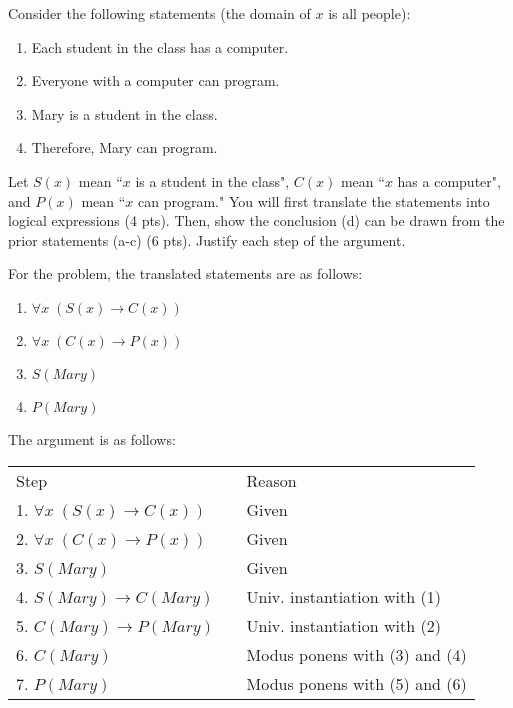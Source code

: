 \documentclass[12pt,addpoints]{exam}
\newcommand{\ra}{\rightarrow}
\begin{document}
\begin{questions}
\question[10] Consider the following statements (the domain of $x$ is all people):
	\begin{enumerate}[label=(\alph*),itemsep=0pt,parsep=0pt,
    	topsep=0pt,partopsep=0pt]
    	\item Each student in the class has a computer.
    	\item Everyone with a computer can program.
    	\item Mary is a student in the class.
    	\item Therefore, Mary can program.
    \end{enumerate}
Let $S(x)$ mean ``$x$ is a student in the class", $C(x)$ mean ``$x$ has a computer", and $P(x)$ mean ``$x$ can program."  You will first translate the statements into logical expressions (4 pts).  Then, show the conclusion (d) can be drawn from the prior statements (a-c) (6 pts).  Justify each step of the argument.
	\ifprintanswers
        \vspace{-10pt}
    \fi
\begin{solution}
    For the problem, the translated statements are as follows:
	\begin{enumerate}[label=(\alph*),itemsep=0pt,parsep=0pt,
    	topsep=0pt,partopsep=0pt]
    	\item $\forall x\; (S(x) \ra C(x))$
    	\item $\forall x\; (C(x) \ra P(x))$
    	\item $S(Mary)$
    	\item $P(Mary)$
    \end{enumerate}
    
    The argument is as follows:
    
    \begin{tabular}{lll}
            Step                    & \hspace{0.15in} & Reason \\
            1. $\forall x\; (S(x) \ra C(x))$			& & Given \\
            2. $\forall x\; (C(x) \ra P(x))$			& & Given \\
            3. $S(Mary)$								& & Given \\
            4. $S(Mary) \ra C(Mary)$   					& & Univ. instantiation with (1) \\
            5. $C(Mary) \ra P(Mary)$                    & & Univ. instantiation with (2) \\
            6. $C(Mary)$                				& & Modus ponens with (3) and (4) \\
            7. $P(Mary)$                				& & Modus ponens with (5) and (6) \\
    \end{tabular}
\end{solution}



\end{questions}
\end{document}
